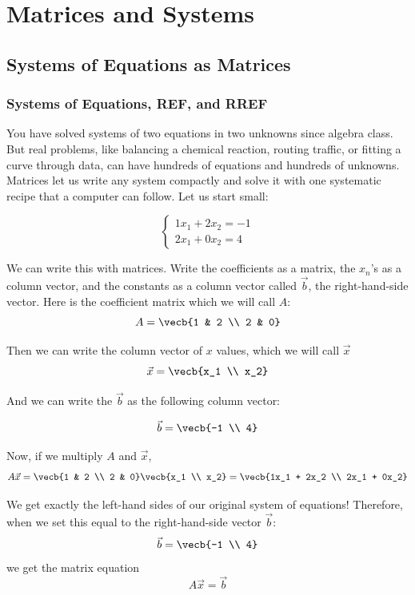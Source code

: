 \chapter{Matrices and Systems}

\section{Systems of Equations as Matrices}\label{chap:syseqma}

\subsection{Systems of Equations, REF, and RREF}

You have solved systems of two equations in two unknowns since algebra
class. But real problems, like balancing a chemical reaction, routing
traffic, or fitting a curve through data, can have hundreds of equations
and hundreds of unknowns. Matrices let us write any system compactly and
solve it with one systematic recipe that a computer can follow. Let us
start small:

\[\begin{cases}
1x_1 + 2x_2 = -1 \\
2x_1 + 0x_2 = 4
\end{cases}\]

We can write this with matrices. Write the coefficients as a matrix, the $x_n$'s as a column vector, and the constants as a column vector called $\vec{b}$, the right-hand-side vector.
Here is the coefficient matrix which we will call $A$:
\[A = \vecb{1 & 2 \\ 2 & 0}\]

Then we can write the column vector of $x$ values, which we will call $\vec{x}$
\[\vec{x} = \vecb{x_1 \\ x_2}\] 

And we can write the $\vec{b}$ as the following column vector:

\[
\vec{b} = \vecb{-1 \\ 4}
\]

Now, if we multiply $A$ and $\vec{x}$,
$$A\vec{x} = \vecb{1 & 2 \\ 2 & 0}\vecb{x_1 \\ x_2} = \vecb{1x_1 + 2x_2 \\ 2x_1 + 0x_2}$$

We get exactly the left-hand sides of our original system of equations!
Therefore, when we set this equal to the right-hand-side vector $\vec{b}$:
$$\vec{b}=\vecb{-1 \\ 4}$$
we get the matrix equation
\begin{equation}
       A\vec{x} = \vec{b}
       \label{eq:matrixform}
\end{equation}

